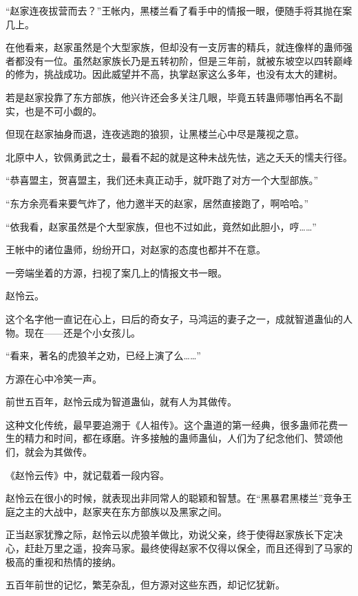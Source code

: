 
\begin{this_body}

“赵家连夜拔营而去？”王帐内，黑楼兰看了看手中的情报一眼，便随手将其抛在案几上。

在他看来，赵家虽然是个大型家族，但却没有一支厉害的精兵，就连像样的蛊师强者都没有一位。虽然赵家族长乃是五转初阶，但是三年前，就被东坡空以四转巅峰的修为，挑战成功。因此威望并不高，执掌赵家这么多年，也没有太大的建树。

若是赵家投靠了东方部族，他兴许还会多关注几眼，毕竟五转蛊师哪怕再名不副实，也是不可小觑的。

但现在赵家抽身而退，连夜逃跑的狼狈，让黑楼兰心中尽是蔑视之意。

北原中人，钦佩勇武之士，最看不起的就是这种未战先怯，逃之夭夭的懦夫行径。

“恭喜盟主，贺喜盟主，我们还未真正动手，就吓跑了对方一个大型部族。”

“东方余亮看来要气炸了，他力邀半天的赵家，居然直接跑了，啊哈哈。”

“依我看，赵家虽然是个大型家族，但也不过如此，竟然如此胆小，哼……”

王帐中的诸位蛊师，纷纷开口，对赵家的态度也都并不在意。

一旁端坐着的方源，扫视了案几上的情报文书一眼。

赵怜云。

这个名字他一直记在心上，曰后的奇女子，马鸿运的妻子之一，成就智道蛊仙的人物。现在——还是个小女孩儿。

“看来，著名的虎狼羊之劝，已经上演了么……”

方源在心中冷笑一声。

前世五百年，赵怜云成为智道蛊仙，就有人为其做传。

这种文化传统，最早要追溯于《人祖传》。这个蛊道的第一经典，很多蛊师花费一生的精力和时间，都在琢磨。许多接触的蛊师蛊仙，人们为了纪念他们、赞颂他们，就会为其做传。

《赵怜云传》中，就记载着一段内容。

赵怜云在很小的时候，就表现出非同常人的聪颖和智慧。在“黑暴君黑楼兰”竞争王庭之主的大战中，赵家夹在东方部族以及黑家之间。

正当赵家犹豫之际，赵怜云以虎狼羊做比，劝说父亲，终于使得赵家族长下定决心，赶赴万里之遥，投奔马家。最终使得赵家不仅得以保全，而且还得到了马家的极高的重视和热情的接纳。

五百年前世的记忆，繁芜杂乱，但方源对这些东西，却记忆犹新。


\end{this_body}
